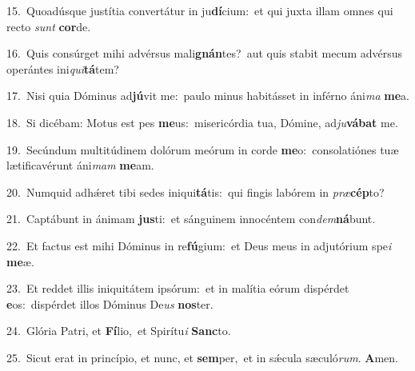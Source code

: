 {\numbfont\textcolor{\numbcolor}{15.}}~Quoadúsque justítia convertátur in ju\-\textbf{dí}\-cium:~\star et qui juxta illam omnes qui recto \textit{sunt} \textbf{cor}\-de.\par
{\numbfont\textcolor{\numbcolor}{16.}}~Quis consúrget mihi advérsus mali\-\textbf{gnán}\-tes?~\star aut quis stabit mecum advérsus operántes ini\-\textit{qui}\-\textbf{tá}tem?\par
{\numbfont\textcolor{\numbcolor}{17.}}~Nisi quia Dóminus ad\-\textbf{jú}\-vit me:~\star paulo minus habitásset in inférno áni\textit{ma} \textbf{me}\-a.\par
{\numbfont\textcolor{\numbcolor}{18.}}~Si dicébam: Motus est pes \textbf{me}\-us:~\star misericórdia tua, Dómine, ad\-\textit{ju}\-\textbf{vá}\textbf{bat} me.\par
{\numbfont\textcolor{\numbcolor}{19.}}~Secúndum multitúdinem dolórum meórum in corde \textbf{me}\-o:~\star consolatiónes tuæ lætificavérunt áni\textit{mam} \textbf{me}\-am.\par
{\numbfont\textcolor{\numbcolor}{20.}}~Numquid adhǽret tibi sedes iniqui\-\textbf{tá}\-tis:~\star qui fingis labórem in \textit{præ}\-\textbf{cép}to?\par
{\numbfont\textcolor{\numbcolor}{21.}}~Captábunt in ánimam \textbf{jus}\-ti:~\star et sánguinem innocéntem con\-\textit{dem}\-\textbf{ná}bunt.\par
{\numbfont\textcolor{\numbcolor}{22.}}~Et factus est mihi Dóminus in re\-\textbf{fú}\-gium:~\star et Deus meus in adjutórium spe\textit{i} \textbf{me}\-æ.\par
{\numbfont\textcolor{\numbcolor}{23.}}~Et reddet illis iniquitátem ipsórum:~\dagger et in malítia eórum dispérdet \textbf{e}\-os:~\star dispérdet illos Dóminus De\textit{us} \textbf{nos}\-ter.\par
{\numbfont\textcolor{\numbcolor}{24.}}~Glória Patri, et \textbf{Fí}\-lio,~\star et Spirítu\textit{i} \textbf{Sanc}\-to.\par
{\numbfont\textcolor{\numbcolor}{25.}}~Sicut erat in princípio, et nunc, et \textbf{sem}\-per,~\star et in sǽcula sæculó\-\textit{rum}\-. \textbf{A}\-men.\par

